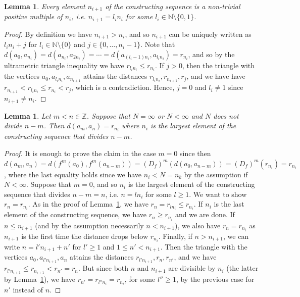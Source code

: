 \documentclass[oneside,notitlepage,12pt]{article}
\newtheorem{lm}[tw]{Lemma}
\theoremstyle{definition}
\theoremstyle{remark}
\newcommand \set [1]{\{#1\}}
\newcommand \N {\mathbb{N}}
\newcommand \Z {\mathbb{Z}}
\begin{document}
\begin{lm} \label{thm:constructing_sequence}
    Every element $n_{i + 1}$ of the constructing sequence is a non-trivial positive multiple of $n_i$, i.e. $n_{i + 1} = l_i n_i$ for some $l_i \in \N \setminus \set{0, 1}$.
\end{lm}
\begin{proof}
    By definition we have $n_{i + 1} > n_i$, and so $n_{i + 1}$ can be uniquely written as $l_i n_i + j$ for $l_i \in \N \setminus \set{0}$ and $j \in \set{0, \ldots, n_i - 1}$.
    Note that $d(a_0, a_{n_i}) = d(a_{n_i}, a_{2n_i}) = \cdots = d(a_{(l_i - 1) n_i}, a_{l_i n_i}) = r_{n_i}$, and so by the ultrametric triangle inequality we have $r_{l_i n_i} \leq r_{n_i}$.
    If $j > 0$, then the triangle with the vertices $a_0, a_{l_i n_i}, a_{n_{i + 1}}$ attains the distances $r_{l_i n_i}, r_{n_{i + 1}}, r_j$, and we have have $r_{n_{i + 1}} < r_{l_i n_i} \leq r_{n_i} < r_j$, which is a contradiction.
    Hence, $j = 0$ and $l_i \neq 1$ since $n_{i + 1} \neq n_i$.
\end{proof}

\begin{lm} \label{thm:horizontal_distances}
     Let $m < n \in \Z$.  Suppose that $N=\infty$ or $N<\infty$ and $N$ does not divide $n - m$. Then  $d(a_m, a_n) = r_{n_i}$ where $n_i$ is the largest element of the constructing sequence that divides $n - m$.
\end{lm}
\begin{proof}
    It is enough to prove the claim in the case $m = 0$ since then $d(a_m, a_n) = d(f^m(a_0), f^m(a_{n - m})) = (D_f)^m(d(a_0, a_{n - m})) = (D_f)^m(r_{n_i}) = r_{n_i}$, where the last equality holds since we have $n_i < N = n_k$ by the assumption if $N < \infty$.
    Suppose that $m = 0$, and so $n_i$ is the largest element of the constructing sequence that divides $n - m = n$, i.e. $n = l n_i$ for some $l \geq 1$.
    We want to show $r_n = r_{n_i}$.
    As in the proof of Lemma~\ref{thm:constructing_sequence}, we have $r_n = r_{l n_i} \leq r_{n_i}$.
    If $n_i$ is the last element of the constructing sequence, we have $r_n \geq r_{n_i}$ and we are done.
    If $n \leq n_{i + 1}$ (and by the assumption necessarily $n < n_{i + 1}$), we also have $r_n = r_{n_i}$ as $n_{i + 1}$ is the first time the distance drops below $r_{n_i}$.
    Finally, if $n > n_{i + 1}$, we can write $n = l' n_{i + 1} + n'$ for $l' \geq 1$ and $1 \leq n' < n_{i + 1}$.
    Then the triangle with the vertices $a_0, a_{l' n_{i + 1}}, a_n$ attains the distances $r_{l' n_{i + 1}}, r_n, r_{n'}$, and we have $r_{l' n_{i + 1}} \leq r_{n_{i + 1}} < r_{n'} = r_n$.
    But since both $n$ and $n_{i + 1}$ are divisible by $n_i$ (the latter by Lemma~\ref{thm:constructing_sequence}), we have $r_{n'} = r_{l'' n_i} = r_{n_i}$, for some $l''\geq 1$, by the previous case for $n'$ instead of $n$.
\end{proof}
\end{document}
